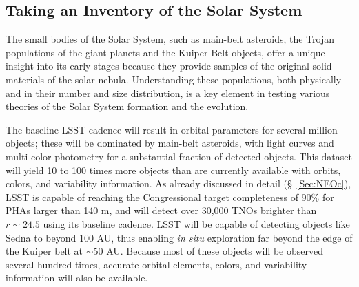 \documentclass{emulateapj}
\begin{document}
\subsection{Taking an Inventory of the Solar System}


The small bodies of the Solar System, such as main-belt asteroids,
the Trojan populations of the giant planets and the Kuiper Belt objects,
offer a unique insight into its early stages because they provide
samples of the original solid materials of the solar nebula. 
Understanding these populations, both physically and in their number 
and size distribution, is a key element in testing various theories of
the Solar System formation and the evolution. 

The baseline LSST cadence will result in orbital parameters for several
million objects; these will be dominated by main-belt asteroids, with 
light curves and multi-color photometry for a substantial fraction of detected objects. 
This dataset will yield 10 to 100 times more objects than are currently
available with orbits, colors, and variability information. As already
discussed in detail (\S~\ref{Sec:NEOc}), LSST is capable of reaching the Congressional target 
completeness of 90\% for PHAs larger than 140 m, and will detect over 30,000 TNOs 
brighter than $r\sim24.5$ using its baseline cadence. LSST will be capable
of detecting objects like Sedna to beyond 100 AU, thus enabling {\it in situ} exploration
far beyond the edge of the Kuiper belt at $\sim$50 AU. Because most of these
objects will be observed several hundred times, accurate orbital elements, 
colors, and variability information will also be available.
\end{document}
